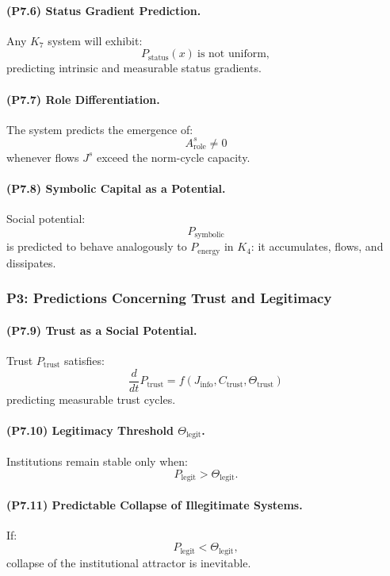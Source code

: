 \paragraph{(P7.6) Status Gradient Prediction.}
Any $K_7$ system will exhibit:
\[
P_{\mathrm{status}}(x) \ \text{is not uniform},
\]
predicting intrinsic and measurable status gradients.

\paragraph{(P7.7) Role Differentiation.}
The system predicts the emergence of:
\[
A_{\mathrm{role}}^s \neq 0
\]
whenever flows $J^s$ exceed the norm-cycle capacity.

\paragraph{(P7.8) Symbolic Capital as a Potential.}
Social potential:
\[
P_{\mathrm{symbolic}}
\]
is predicted to behave analogously to $P_{\mathrm{energy}}$ in $K_4$:
it accumulates, flows, and dissipates.

\subsubsection{P3: Predictions Concerning Trust and Legitimacy}

\paragraph{(P7.9) Trust as a Social Potential.}
Trust $P_{\mathrm{trust}}$ satisfies:
\[
\frac{d}{dt} P_{\mathrm{trust}} = f(J_{\mathrm{info}}, C_{\mathrm{trust}}, \Theta_{\mathrm{trust}})
\]
predicting measurable trust cycles.

\paragraph{(P7.10) Legitimacy Threshold $\Theta_{\mathrm{legit}}$.}
Institutions remain stable only when:
\[
P_{\mathrm{legit}} > \Theta_{\mathrm{legit}}.
\]

\paragraph{(P7.11) Predictable Collapse of Illegitimate Systems.}
If:
\[
P_{\mathrm{legit}} < \Theta_{\mathrm{legit}},
\]
collapse of the institutional attractor is inevitable.

